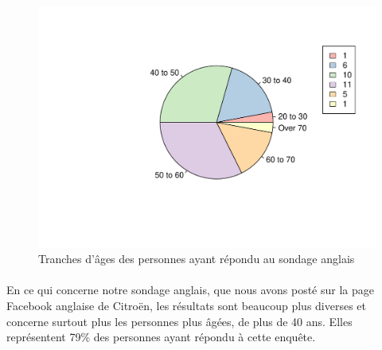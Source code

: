 \documentclass[12pt]{article}\usepackage[]{graphicx}\usepackage[]{color}
\makeatletter
\def\maxwidth{ %
  \ifdim\Gin@nat@width>\linewidth
    \linewidth
  \else
    \Gin@nat@width
  \fi
}
\newenvironment{knitrout}{}{} %
\makeatother
\begin{document}
\begin{knitrout}
\color{fgcolor}\begin{figure}[H]
\includegraphics[width=\maxwidth]{figure/tranche_age_en-1} \caption[Tranches d'âges des personnes ayant répondu au sondage anglais]{Tranches d'âges des personnes ayant répondu au sondage anglais}\label{fig:tranche age en}
\end{figure}


\end{knitrout}

\paragraph{} En ce qui concerne notre sondage anglais, que nous avons posté sur
la page Facebook anglaise de Citroën, les résultats sont beaucoup plus diverses
et concerne surtout plus les personnes plus âgées, de plus de 40 ans. Elles
représentent 79\% des personnes ayant répondu à cette enquête.
\end{document}

